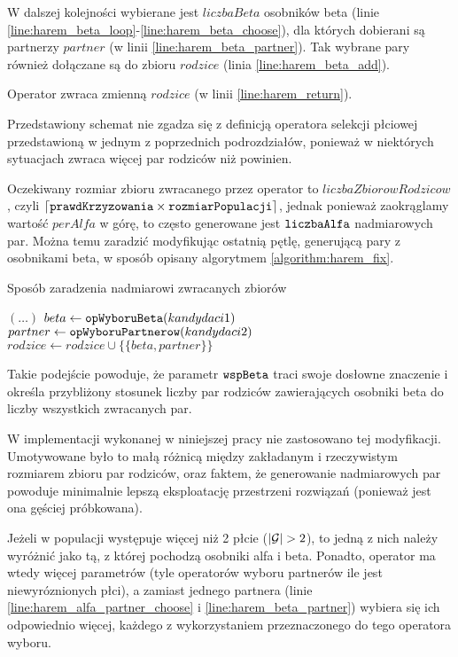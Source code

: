 \documentclass[./FM_mgr.tex]{subfiles}
\begin{document}
W dalszej kolejności wybierane jest $liczbaBeta$ osobników beta (linie \ref{line:harem_beta_loop}-\ref{line:harem_beta_choose}), dla których dobierani są partnerzy $partner$ (w linii \ref{line:harem_beta_partner}). Tak wybrane pary również dołączane są do zbioru $rodzice$ (linia \ref{line:harem_beta_add}).

Operator zwraca zmienną $rodzice$ (w linii \ref{line:harem_return}).

Przedstawiony schemat nie zgadza się z definicją operatora selekcji płciowej przedstawioną w jednym z poprzednich podrozdziałów, ponieważ w niektórych sytuacjach zwraca więcej par rodziców niż powinien. 

Oczekiwany rozmiar zbioru zwracanego przez operator to $liczbaZbiorowRodzicow$, czyli $\lceil \mathtt{prawdKrzyzowania} \times \mathtt{rozmiarPopulacji} \rceil$, jednak ponieważ zaokrąglamy wartość $perAlfa$ w górę, to często generowane jest $\mathtt{liczbaAlfa}$ nadmiarowych par.
Można temu zaradzić modyfikując ostatnią pętlę, generującą pary z osobnikami beta, w sposób opisany algorytmem \ref{algorithm:harem_fix}.

\begin{algorithm}
	\caption{Sposób zaradzenia nadmiarowi zwracanych zbiorów \label{algorithm:harem_fix}}
	\begin{algorithmic}[1]
		\Start
		\State $(\dots)$
		\setcounter{ALG@line}{14}
		\Var $beta \gets \mathtt{opWyboruBeta}(kandydaci1)$
		\Var $partner \gets \mathtt{opWyboruPartnerow}(kandydaci2)$
		\State $rodzice \gets rodzice \cup \{ \{ beta, partner \} \}$
		\EndWhile
		\State {}
		\EndOperator
	\end{algorithmic}
\end{algorithm}

Takie podejście powoduje, że parametr $\mathtt{wspBeta}$ traci swoje dosłowne znaczenie i określa przybliżony stosunek liczby par rodziców zawierających osobniki beta do liczby wszystkich zwracanych par.

W implementacji wykonanej w niniejszej pracy nie zastosowano tej modyfikacji.
Umotywowane było to małą różnicą między zakładanym i rzeczywistym rozmiarem zbioru par rodziców, oraz faktem, że  generowanie nadmiarowych par powoduje minimalnie lepszą eksploatację przestrzeni rozwiązań (ponieważ jest ona gęściej próbkowana).

Jeżeli w populacji występuje więcej niż 2 płcie ($|\mathcal{G}| > 2$), to jedną z nich należy wyróżnić jako tą, z której pochodzą osobniki alfa i beta. 
Ponadto, operator ma wtedy więcej parametrów (tyle operatorów wyboru partnerów ile jest niewyróznionych płci), a zamiast jednego partnera (linie \ref{line:harem_alfa_partner_choose} i \ref{line:harem_beta_partner}) wybiera się ich odpowiednio więcej, każdego z wykorzystaniem przeznaczonego do tego operatora wyboru.
\end{document}
